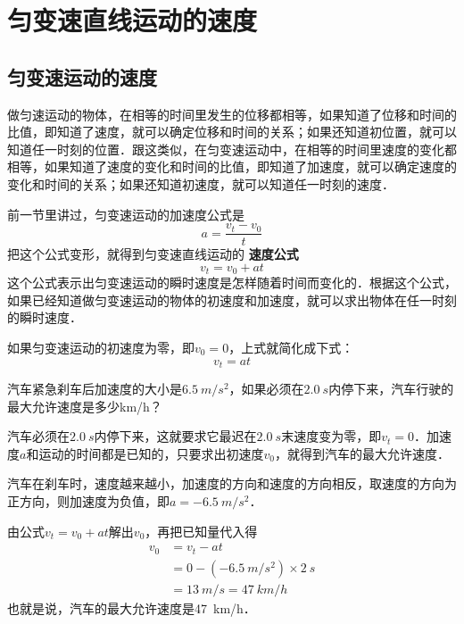 \newpage

\section{匀变速直线运动的速度}

\subsection{匀变速运动的速度}

做匀速运动的物体，在相等的时间里发生的位移都相等，如果知道了位移和时间的比值，即知道了速度，就可以确定位移和时间的关系；如果还知道初位置，就可以知道任一时刻的位置．跟这类似，在匀变速运动中，在相等的时间里速度的变化都相等，如果知道了速度的变化和时间的比值，即知道了加速度，就可以确定速度的变化和时间的关系；如果还知道初速度，就可以知道任一时刻的速度．

前一节里讲过，匀变速运动的加速度公式是
\[a=\frac{v_t-v_0}{t} \]
把这个公式变形，就得到匀变速直线运动的\textbf{ 速度公式}
\begin{equation}
    v_t=v_0+at
\end{equation}
这个公式表示出匀变速运动的瞬时速度是怎样随着时间而变化的．根据这个公式，如果已经知道做匀变速运动的物体的初速度和加速度，就可以求出物体在任一时刻的瞬时速度．

如果匀变速运动的初速度为零，即$v_0=0$，上式就简化成下式：
\[v_t=at \]

\begin{example}
    汽车紧急刹车后加速度的大小是$\qty{6.5}{m/s^2}$，如果必须在$\qty{2.0}{s}$内停下来，汽车行驶的最大允许速度是多少\si{km/h}？
\end{example}

\begin{solution}
    汽车必须在$\qty{2.0}{s}$内停下来，这就要求它最迟在$\qty{2.0}{s}$末速度变为零，即$v_t=0$．加速度$a$和运动的时间都是已知的，只要求出初速度$v_0$，就得到汽车的最大允许速度．

    汽车在刹车时，速度越来越小，加速度的方向和速度的方向相反，取速度的方向为正方向，则加速度为负值，即$a=\qty{-6.5}{m/s^2}$．

    由公式$v_t=v_0+at$解出$v_0$，再把已知量代入得
    \begin{equation*}
        \begin{aligned}
            v_0 & =v_t-at                                 \\
                & =0-(\qty{-6.5}{m/s^2})\times \qty{2}{s} \\
                & =\qty{13}{m/s}=\qty{47}{km/h}
        \end{aligned}
    \end{equation*}
    也就是说，汽车的最大允许速度是\qty{47}{km/h}．
\end{solution}


